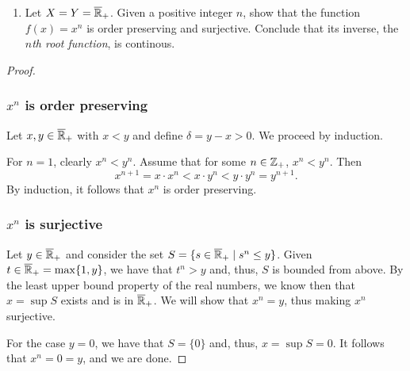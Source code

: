 \begin{solution}
  \begin{enumerate}[label={(\alph*)}, align=left, leftmargin=\parindent, listparindent=\parindent, labelwidth=0pt, itemindent=!]
    \addtocounter{enumi}{1} 
    \item
      Let $X = Y = \overline{\mathbb{R}}_+$.
      Given a positive integer $n$, show that the function $f(x) = x^n$ is order preserving and surjective.
      Conclude that its inverse, the $n$\textit{th root function}, is continous.
  \end{enumerate}
  \begin{proof}~

    \subsubsection*{$x^n$ is order preserving}
    Let $x, y \in \overline{\mathbb{R}}_+$ with $x < y$ and define $\delta = y - x > 0$.
    We proceed by induction.

    For $n = 1$, clearly $x^n < y^n$.
    Assume that for some $n \in \mathbb{Z}_+$, $x^n < y^n$.
    Then
    \begin{equation}
      x^{n+1} = x \cdot x^n < x \cdot y^n < y \cdot y^n = y^{n+1}.
    \end{equation}
    By induction, it follows that $x^n$ is order preserving.
    \bigskip

    \subsubsection*{$x^n$ is surjective}
    Let $y \in \overline{\mathbb{R}}_+$ and consider the set $S = \{s \in \overline{\mathbb{R}}_+ \mid s^n \leq y \}$.
    Given $t \in \overline{\mathbb{R}}_+ = \max\{1, y\}$, we have that $t^n > y$ and, thus, $S$ is bounded from above.
    By the least upper bound property of the real numbers, we know then that $x = \sup S$ exists and is in $\overline{\mathbb{R}}_+$.
    We will show that $x^n = y$, thus making $x^n$ surjective.

    For the case $y = 0$, we have that $S = \{0\}$ and, thus, $x = \sup S = 0$.
    It follows that $x^n = 0 = y$, and we are done.


\end{proof}
\end{solution}
